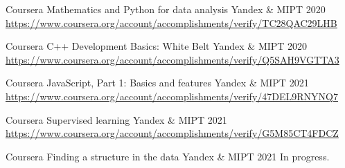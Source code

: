 

\begin{cventries}

  \cventry
    {Coursera} %
    {Mathematics and Python for data analysis} %
    {Yandex \& MIPT} %
    {2020} %
    {
        \href{https://www.coursera.org/account/accomplishments/verify/TC28QAC29LHB}{https://www.coursera.org/account/accomplishments/verify/TC28QAC29LHB}
    }

  \cventry
    {Coursera} %
    {C++ Development Basics: White Belt} %
    {Yandex \& MIPT} %
    {2020} %
    {
        \href{https://www.coursera.org/account/accomplishments/verify/Q5SAH9VGTTA3}{https://www.coursera.org/account/accomplishments/verify/Q5SAH9VGTTA3}
    }

    \cventry
    {Coursera} %
    {JavaScript, Part 1: Basics and features} %
    {Yandex \& MIPT} %
    {2021} %
    {
        \href{https://www.coursera.org/account/accomplishments/verify/47DEL9RNYNQ7}{https://www.coursera.org/account/accomplishments/verify/47DEL9RNYNQ7}
    }
    
    \cventry
    {Coursera} %
    {Supervised learning} %
    {Yandex \& MIPT} %
    {2021} %
    {
        \href{https://www.coursera.org/account/accomplishments/verify/G5M85CT4FDCZ}{https://www.coursera.org/account/accomplishments/verify/G5M85CT4FDCZ}
    }
    
    \cventry
    {Coursera} %
    {Finding a structure in the data} %
    {Yandex \& MIPT} %
    {2021} %
    {
        In progress.
    }
\end{cventries}

